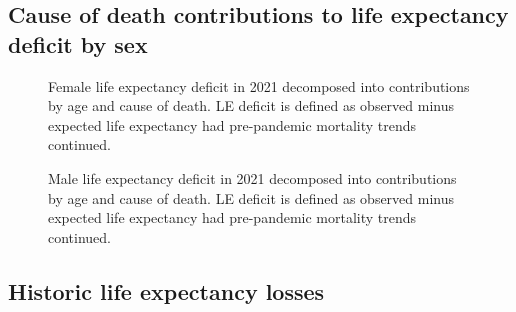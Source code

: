 \documentclass[12pt]{article}
\begin{document}
\subsection*{Cause of death contributions to life expectancy deficit by sex}

\begin{figure}[ht!]
    \centering
    \caption{Female life expectancy deficit in 2021 decomposed into contributions by age and cause of death. LE deficit is defined as observed minus expected life expectancy had pre-pandemic mortality trends continued.}
    \label{fig:figure-a6}
\end{figure}

\begin{figure}[ht!]
    \centering
    \caption{Male life expectancy deficit in 2021 decomposed into contributions by age and cause of death. LE deficit is defined as observed minus expected life expectancy had pre-pandemic mortality trends continued.}
    \label{fig:figure-a7}
\end{figure}

\clearpage

\subsection*{Historic life expectancy losses}
\end{document}
